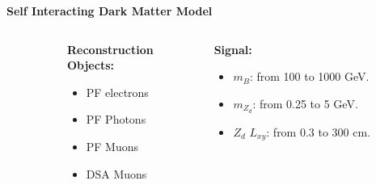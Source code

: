 \documentclass{beamer}
\begin{document}
\begin{frame}[t]{\textbf{Self Interacting Dark Matter Model}}
\begin{columns}
\begin{column}{.4\textwidth}
\end{column}

\begin{column}{.3\textwidth}
\centering
\textbf{\textcolor{peacockblue}{Reconstruction \\
Objects:}}
\begin{itemize}
    \item PF electrons
     \item PF Photons
     \item PF Muons
     \item DSA Muons
\end{itemize}
    
\end{column}
\begin{column}{.3\textwidth}
\centering
\textbf{\textcolor{peacockblue}{Signal:}}
\begin{itemize}
    \item   $m_B$: from 100 to 1000 GeV.
     \item $m_{Z_d}$: from 0.25 to 5 GeV.
     \item $Z_d$ $L_{xy}$: from 0.3 to 300 cm.
\end{itemize}
\end{column}
\end{columns}
\end{frame}
\end{document}
